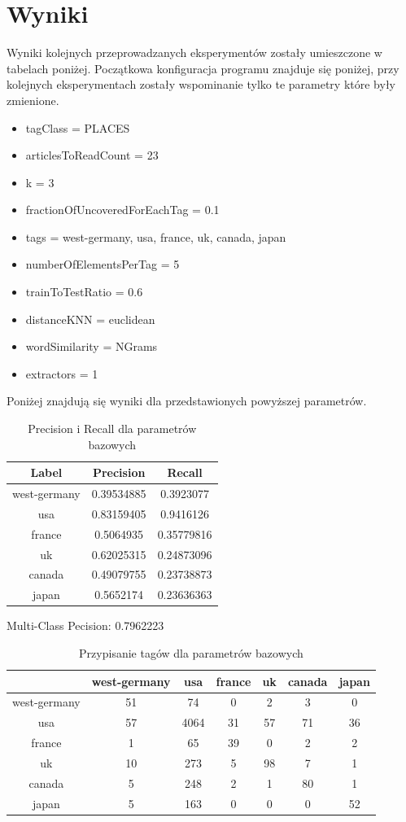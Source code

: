 \documentclass{classrep}
\begin{document}
\section{Wyniki}
Wyniki kolejnych przeprowadzanych eksperymentów zostały umieszczone w tabelach poniżej. Początkowa konfiguracja programu znajduje się poniżej, przy kolejnych eksperymentach zostały wspominanie tylko te parametry które były zmienione.
\begin{itemize}
	\item tagClass = PLACES
	\item articlesToReadCount = 23
	\item k = 3
	\item fractionOfUncoveredForEachTag = 0.1
	\item tags = west-germany, usa, france, uk, canada, japan
	\item numberOfElementsPerTag = 5
	\item trainToTestRatio = 0.6
	\item distanceKNN = euclidean
	\item wordSimilarity = NGrams
	\item extractors = 1
\end{itemize}
Poniżej znajdują się wyniki dla przedstawionych powyższej parametrów.
\begin{table}[H]
\begin{tabular}{|c|c|c|}
\hline
Label        & Precision  & Recall     \\ \hline
west-germany & 0.39534885 & 0.3923077  \\ \hline
usa          & 0.83159405 & 0.9416126  \\ \hline
france       & 0.5064935  & 0.35779816 \\ \hline
uk           & 0.62025315 & 0.24873096 \\ \hline
canada       & 0.49079755 & 0.23738873 \\ \hline
japan        & 0.5652174  & 0.23636363 \\ \hline
\end{tabular}
\caption{Precision i Recall dla parametrów bazowych}
\end{table}
Multi-Class Pecision: 0.7962223
\begin{table}[H]
\begin{tabular}{|c|c|c|c|c|c|c|}
\hline
             & west-germany & usa  & france & uk & canada & japan \\ \hline
west-germany & 51           & 74   & 0      & 2  & 3      & 0     \\ \hline
usa          & 57           & 4064 & 31     & 57 & 71     & 36    \\ \hline
france       & 1            & 65   & 39     & 0  & 2      & 2     \\ \hline
uk           & 10           & 273  & 5      & 98 & 7      & 1     \\ \hline
canada       & 5            & 248  & 2      & 1  & 80     & 1     \\ \hline
japan        & 5            & 163  & 0      & 0  & 0      & 52    \\ \hline
\end{tabular}
\caption{Przypisanie tagów dla parametrów bazowych}
\end{table}
\end{document}
